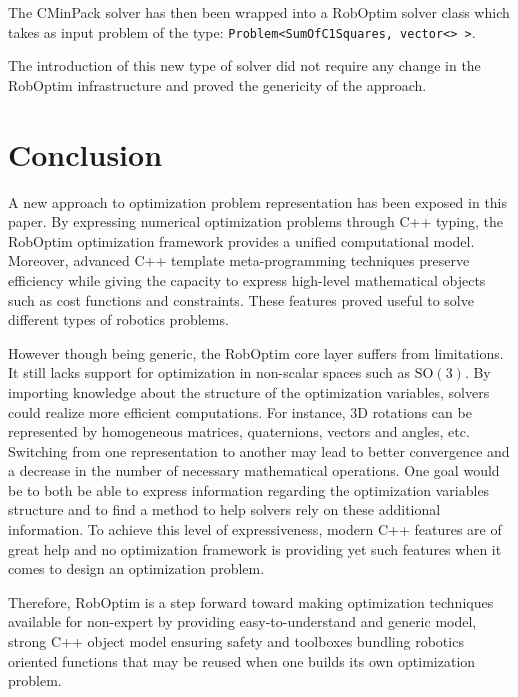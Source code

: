 \documentclass[conference,final,a4paper,twocolumn,9pt]{IEEEtran}
\begin{document}
The CMinPack solver has then
been wrapped into a RobOptim solver class which takes as input problem
of the type: \texttt{Problem<SumOfC1Squares, vector<> >}.

The introduction of this new type of solver did not require any change
in the RobOptim infrastructure and proved the genericity of the
approach.


\section{Conclusion}\label{sec:conclusion}


A new approach to optimization problem representation has been exposed
in this paper. By expressing numerical optimization problems through
C++ typing, the RobOptim optimization framework provides a unified
computational model. Moreover, advanced C++ template meta-programming
techniques preserve efficiency while giving the capacity to express
high-level mathematical objects such as cost functions and
constraints. These features proved useful to solve different types of
robotics problems.

However though being generic, the RobOptim core layer suffers from
limitations. It still lacks support for optimization in non-scalar
spaces such as $\text{SO}(3)$. By importing knowledge about the
structure of the optimization variables, solvers could realize more
efficient computations. For instance, \mbox{3D} rotations can be
represented by homogeneous matrices, quaternions, vectors and angles,
etc. Switching from one representation to another may lead to better
convergence and a decrease in the number of necessary mathematical
operations. One goal would be to both be able to express information
regarding the optimization variables structure and to find a method to
help solvers rely on these additional information. To achieve this
level of expressiveness, modern C++ features are of great help and no
optimization framework is providing yet such features when it comes to
design an optimization problem.


Therefore, RobOptim is a step forward toward making optimization
techniques available for non-expert by providing easy-to-understand
and generic model, strong C++ object model ensuring safety and
toolboxes bundling robotics oriented functions that may be reused when
one builds its own optimization problem.




\end{document}
